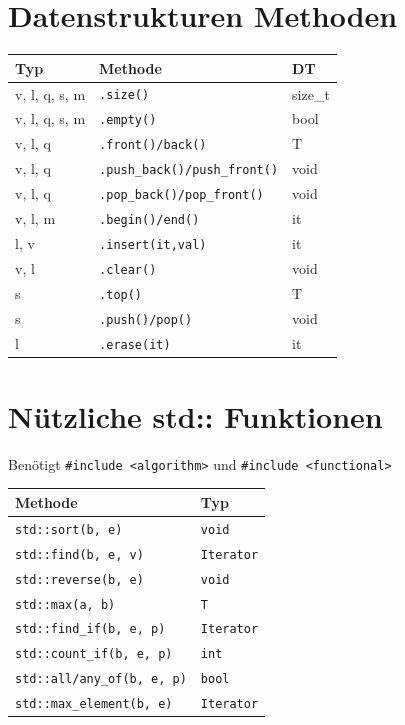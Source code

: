 \documentclass[8pt, landscape]{article}
\begin{document}
\begin{multicols*}{4}
 \section{Datenstrukturen Methoden}
\noindent
\begin{tabularx}{\linewidth}{l l >{\RaggedRight}X}
\toprule
\textbf{Typ} & \textbf{Methode} & \textbf{DT} \\
\midrule
v, l, q, s, m & \lstinline|.size()| & size\_t \\
v, l, q, s, m & \lstinline|.empty()| & bool \\
v, l, q & \lstinline|.front()/back()| & T \\
v, l, q& \lstinline|.push_back()/push_front()| & void \\
v, l, q & \lstinline|.pop_back()/pop_front()| & void \\
v, l, m & \lstinline|.begin()/end()| & it \\
l, v & \lstinline|.insert(it,val)| & it  \\
v, l & \lstinline|.clear()| & void \\
s & \lstinline|.top()| & T \\
s & \lstinline|.push()/pop()| & void \\
l & \lstinline|.erase(it)| & it  \\
\bottomrule
\end{tabularx}




 \section{Nützliche std:: Funktionen}
 Benötigt \lstinline|#include <algorithm>| und \lstinline|#include <functional>|

 \noindent
 \begin{tabularx}{\linewidth}{l >{\RaggedRight}X}
 \toprule
 \textbf{Methode} & \textbf{Typ} \\
 \midrule
 \lstinline|std::sort(b, e)| & \lstinline|void| \\
 \lstinline|std::find(b, e, v)| & \lstinline|Iterator| \\
 \lstinline|std::reverse(b, e)| & \lstinline|void|  \\
 \lstinline|std::max(a, b)| & \lstinline|T| \\
 \lstinline|std::find_if(b, e, p)| & \lstinline|Iterator|\\
 \lstinline|std::count_if(b, e, p)| & \lstinline|int|\\
 \lstinline|std::all/any_of(b, e, p)| & \lstinline|bool| \\
 \lstinline|std::max_element(b, e)| & \lstinline|Iterator|\\


\end{tabularx}
\end{multicols*}
\end{document}
